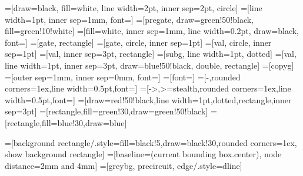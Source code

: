 =[draw=black, fill=white, line width=2pt, inner sep=2pt, circle]
=[line width=1pt, inner sep=1mm, font=\small]
=[pregate, draw=green!50!black, fill=green!10!white]
=[fill=white, inner sep=1mm, line width=0.2pt, draw=black, font=\small]
=[gate, rectangle]
=[gate, circle, inner sep=1pt]
=[val, circle, inner sep=1pt]
=[val, inner sep=3pt, rectangle]
=[subg, line width=1pt, dotted]
=[val, line width=1pt, inner sep=3pt, draw=blue!50!black, double, rectangle]
=[copyg]
=[outer sep=1mm, inner sep=0mm, font=\small]
=[font=\small]
=[-,rounded corners=1ex,line width=0.5pt,font=\small]
=[->,>=stealth,rounded corners=1ex,line width=0.5pt,font=\small]
=[draw=red!50!black,line width=1pt,dotted,rectangle,inner sep=3pt]
=[rectangle,fill=green!30,draw=green!50!black]
=[rectangle,fill=blue!30,draw=blue]

=[background rectangle/.style={fill=black!5,draw=black!30,rounded corners=1ex}, show background rectangle]
=[baseline=(current bounding box.center), node distance=2mm and 4mm]
=[greybg, precircuit, edge/.style={dline}]




